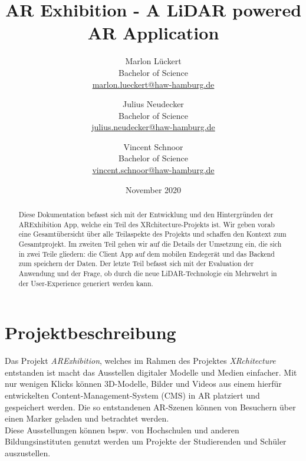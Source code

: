\documentclass[titlepage, a4paper, 11pt]{scrartcl}
\title{AR Exhibition - A LiDAR powered AR Application}
\author{Marlon Lückert \\ Bachelor of Science \\ \href{mailto:marlon.lueckert@haw-hamburg.de}{marlon.lueckert@haw-hamburg.de} 
\and Julius Neudecker \\ Bachelor of Science \\ \href{mailto:julius.neudecker@haw-hamburg.de}{julius.neudecker@haw-hamburg.de}
\and Vincent Schnoor \\ Bachelor of Science \\ \href{mailto:vincent.schnoor@haw-hamburg.de}{vincent.schnoor@haw-hamburg.de} }
\date{November 2020}
\begin{document}
  \maketitle

  \tableofcontents

  \begin{abstract}
    Diese Dokumentation befasst sich mit der Entwicklung und den Hintergründen der ARExhibition App, welche ein Teil des XRchitecture-Projekts ist.
    Wir geben vorab eine Gesamtübersicht über alle Teilaspekte des Projekts und schaffen den Kontext zum Gesamtprojekt.
    Im zweiten Teil gehen wir auf die Details der Umsetzung ein, die sich in zwei Teile gliedern: die Client App auf dem mobilen Endegerät und das Backend zum speichern der Daten.
    Der letzte Teil befasst sich mit der Evaluation der Anwendung und der Frage, ob durch die neue LiDAR-Technologie ein Mehrwehrt in der User-Experience generiert werden kann.
  \end{abstract}


  \section{Projektbeschreibung}
    Das Projekt \textit{ARExhibition}, welches im Rahmen des Projektes \textit{XRchitecture} entstanden ist macht das Ausstellen digitaler Modelle und Medien einfacher. 
    Mit nur wenigen Klicks können 3D-Modelle, Bilder und Videos aus einem hierfür entwickelten Content-Management-System (CMS) in AR platziert und gespeichert werden. 
    Die so entstandenen AR-Szenen können von Besuchern über einen Marker geladen und betrachtet werden.\\
    Diese Ausstellungen können bspw. von Hochschulen und anderen Bildungsinstituten genutzt werden um Projekte der Studierenden und Schüler auszustellen.
\end{document}

